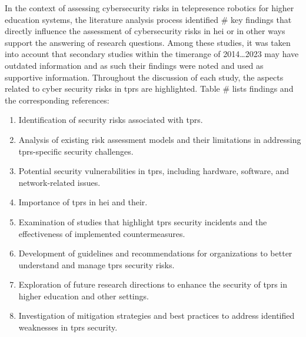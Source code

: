 In the context of assessing cybersecurity risks in telepresence robotics for higher education systems, the literature analysis process
identified \# key findings that directly influence the assessment of cybersecurity risks in \ac{hei} or in other ways support the
answering of research questions. Among
these studies, it was taken into account that secondary studies within the timerange of 2014\ldots2023 may have outdated information and
as such their findings were noted and used as supportive information. Throughout the discussion of each study, the aspects related to
cyber security risks in \ac{tprs} are highlighted. Table \# lists findings and the corresponding references:

\begin{enumerate}
  \item Identification of security risks associated with \ac{tprs}.
  \item Analysis of existing risk assessment models and their limitations in addressing \ac{tprs}-specific security challenges.
  \item Potential security vulnerabilities in \ac{tprs}, including hardware, software, and network-related issues.
  \item Importance of \ac{tprs} in \ac{hei} and their.
  \item Examination of studies that highlight \ac{tprs} security incidents and the effectiveness of implemented countermeasures.
  \item Development of guidelines and recommendations for organizations to better understand and manage \ac{tprs} security risks.
  \item Exploration of future research directions to enhance the security of \ac{tprs} in higher education and other settings.
  \item Investigation of mitigation strategies and best practices to address identified weaknesses in \ac{tprs} security.
\end{enumerate}

